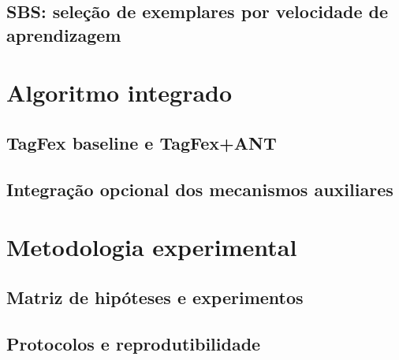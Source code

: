\subsection{SBS: seleção de exemplares por velocidade de aprendizagem}

\section{Algoritmo integrado}

\subsection{TagFex baseline e TagFex+ANT}

\subsection{Integração opcional dos mecanismos auxiliares}

\section{Metodologia experimental}

\subsection{Matriz de hipóteses e experimentos}

\subsection{Protocolos e reprodutibilidade}

